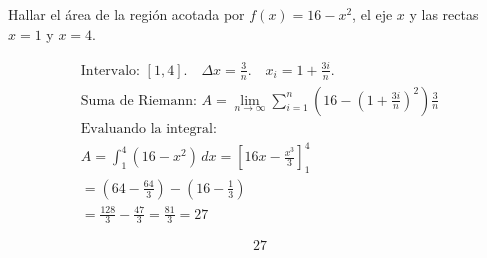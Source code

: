 Hallar el área de la región acotada por $f(x)=16-x^2$, el eje $x$ y las rectas $x=1$ y $x=4$.

\nopagebreak
\begin{align*}
\text{Intervalo: } [1,4]. \quad \Delta x = \frac{3}{n}. \quad x_i = 1 + \frac{3i}{n}. \\
\text{Suma de Riemann: } A = \lim_{n \to \infty} \sum_{i=1}^{n} \left(16 - \left(1+\frac{3i}{n}\right)^2\right) \frac{3}{n} \\
\text{Evaluando la integral:} \\
A = \int_{1}^{4} (16-x^2) \, dx = \left[ 16x - \frac{x^3}{3} \right]_{1}^{4} \\
= \left(64 - \frac{64}{3}\right) - \left(16 - \frac{1}{3}\right) \\
= \frac{128}{3} - \frac{47}{3} = \frac{81}{3} = 27
\end{align*}

\[
\boxed{\displaystyle 27}
\]
